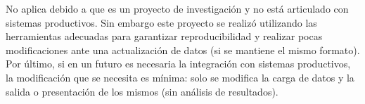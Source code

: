 No aplica debido a que es un proyecto de investigación y no está articulado con sistemas productivos. Sin embargo este proyecto se realizó utilizando las herramientas adecuadas para garantizar reproducibilidad y realizar pocas modificaciones ante una actualización de datos (si se mantiene el mismo formato). Por último, si en un futuro es necesaria la integración con sistemas productivos, la modificación que se necesita es mínima: solo se modifica la carga de datos y la salida o presentación de los mismos (sin análisis de resultados).